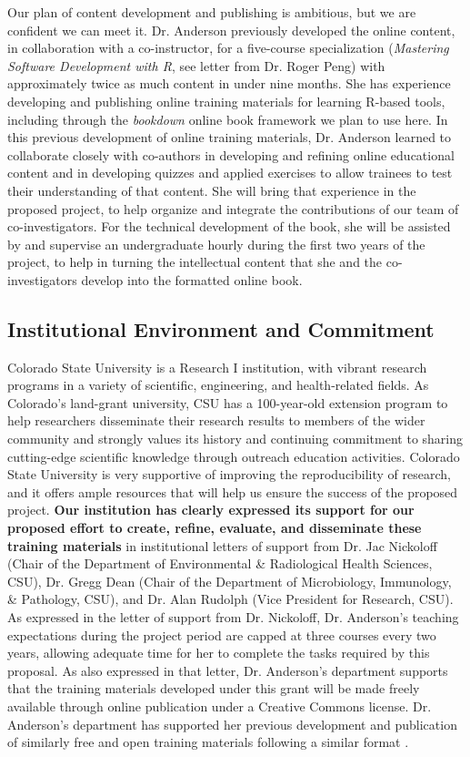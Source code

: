 \documentclass[pdftex,english,11.5pt,parskip=half]{scrartcl}
\begin{document}
Our plan of content development and publishing is ambitious, but we are
confident we can meet it. Dr. Anderson previously developed the online content,
in collaboration with a co-instructor, for a five-course specialization (\textit{Mastering Software Development with R}, see letter from Dr. Roger Peng) with
approximately twice as much content in under nine months. She has experience
developing and publishing online training materials for learning R-based tools,
including through the \textit{bookdown} online book framework we plan to use
here. In this previous development of online training materials, Dr. Anderson
learned to collaborate closely with co-authors in developing and refining online educational
content and in developing quizzes and applied exercises to allow trainees to
test their understanding of that content. She will bring that experience in the
proposed project, to help organize and integrate the contributions of our team
of co-investigators. For the technical development of the book, she will be
assisted by and supervise an undergraduate hourly during the first two years of
the project, to help in turning the intellectual content that she and the
co-investigators develop into the formatted online book. 

\subsection{Institutional Environment and Commitment}

Colorado State University is a Research I institution, with vibrant research programs in a variety of scientific, engineering, and health-related fields. As Colorado's land-grant university, CSU has a 100-year-old extension program to help researchers disseminate their research results to members of the wider community and strongly values its history and continuing commitment to sharing cutting-edge scientific knowledge through outreach education activities. Colorado State University is very supportive of improving the reproducibility of
research, and it offers ample resources that will help us ensure the success of
the proposed project. \textbf{Our institution has clearly expressed its support
for our proposed effort to create, refine, evaluate, and disseminate these
training materials} in institutional letters of support from Dr. Jac Nickoloff
(Chair of the Department of Environmental \& Radiological Health Sciences, CSU),
Dr. Gregg Dean (Chair of the Department of Microbiology, Immunology, \&
Pathology, CSU), and Dr. Alan Rudolph (Vice President for Research, CSU). As
expressed in the letter of support from Dr. Nickoloff, Dr. Anderson's teaching
expectations during the project period are capped at three courses every two
years, allowing adequate time for her to complete the tasks required by this
proposal. As also expressed in that letter, Dr. Anderson's department supports
that the training materials developed under this grant will be made freely
available through online publication under a Creative Commons license. Dr.
Anderson's department has supported her previous development and publication of
similarly free and open training materials following a similar format \cite{andersoncoursebook, andersonmastering}.
\end{document}
